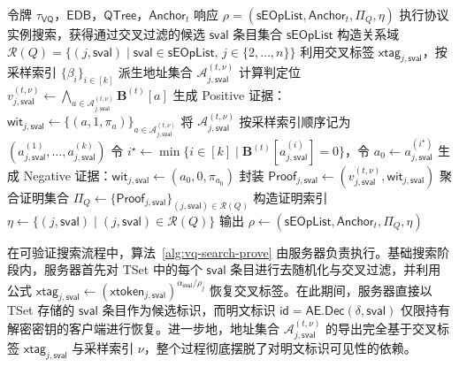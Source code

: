 \begin{algorithm}[!t]
\caption{可验证搜索算法 $\mathsf{Search\text{-}Prove}$}
\label{alg:vq-search-prove}
\begin{algorithmic}[1]
\REQUIRE 令牌 $\tau_{\mathsf{VQ}}$，$\mathsf{EDB}$，$\mathsf{QTree}$，$\mathsf{Anchor}_t$
\ENSURE 响应 $\rho=(\mathsf{sEOpList},\mathsf{Anchor}_t,\Pi_Q,\eta)$
\STATE 执行协议实例搜索，获得通过交叉过滤的候选 $\mathsf{sval}$ 条目集合 $\mathsf{sEOpList}$
\STATE 构造关系域 $\mathcal{R}(Q)=\{(j,\mathsf{sval})\mid \mathsf{sval}\in\mathsf{sEOpList},\,j\in\{2,\ldots,n\}\}$
  \STATE 利用交叉标签 $\mathsf{xtag}_{j,\mathsf{sval}}$，按采样索引 $\{\beta_i\}_{i\in[k]}$ 派生地址集合 $\mathcal{A}_{j,\mathsf{sval}}^{(t,\nu)}$
  \STATE 计算判定位 $v_{j,\mathsf{sval}}^{(t,\nu)}\leftarrow\bigwedge_{a\in\mathcal{A}_{j,\mathsf{sval}}^{(t,\nu)}}\mathbf{B}^{(t)}[a]$
    \STATE 生成 Positive 证据：$\mathsf{wit}_{j,\mathsf{sval}}\leftarrow\{(a,1,\pi_a)\}_{a\in\mathcal{A}_{j,\mathsf{sval}}^{(t,\nu)}}$
  \ELSE
    \STATE 将 $\mathcal{A}_{j,\mathsf{sval}}^{(t,\nu)}$ 按采样索引顺序记为 $(a_{j,\mathsf{sval}}^{(1)},\ldots,a_{j,\mathsf{sval}}^{(k)})$
    \STATE 令 $i^\star\leftarrow \min\{i\in[k]\mid \mathbf{B}^{(t)}[a_{j,\mathsf{sval}}^{(i)}]=0\}$，令 $a_0\leftarrow a_{j,\mathsf{sval}}^{(i^\star)}$
    \STATE 生成 Negative 证据：$\mathsf{wit}_{j,\mathsf{sval}}\leftarrow(a_0,0,\pi_{a_0})$
  \ENDIF
  \STATE 封装 $\mathsf{Proof}_{j,\mathsf{sval}}\leftarrow(v_{j,\mathsf{sval}}^{(t,\nu)},\mathsf{wit}_{j,\mathsf{sval}})$
\ENDFOR
\STATE 聚合证明集合 $\Pi_Q\leftarrow\{\mathsf{Proof}_{j,\mathsf{sval}}\}_{(j,\mathsf{sval})\in\mathcal{R}(Q)}$
\STATE 构造证明索引 $\eta\leftarrow\{(j,\mathsf{sval})\mid (j,\mathsf{sval})\in\mathcal{R}(Q)\}$
\STATE 输出 $\rho\leftarrow(\mathsf{sEOpList},\mathsf{Anchor}_t,\Pi_Q,\eta)$
\end{algorithmic}
\end{algorithm}

在可验证搜索流程中，算法~\ref{alg:vq-search-prove} 由服务器负责执行。基础搜索阶段内，服务器首先对 TSet 中的每个 $\mathsf{sval}$ 条目进行去随机化与交叉过滤，并利用公式 $\mathsf{xtag}_{j,\mathsf{sval}}\leftarrow(\mathsf{xtoken}_{j,\mathsf{sval}})^{\alpha_{\mathsf{sval}}/\rho_j}$ 恢复交叉标签。在此期间，服务器直接以 TSet 存储的 $\mathsf{sval}$ 条目作为候选标识，而明文标识 $\mathsf{id}=\mathsf{AE.Dec}(\delta,\mathsf{sval})$ 仅限持有解密密钥的客户端进行恢复。进一步地，地址集合 $\mathcal{A}_{j,\mathsf{sval}}^{(t,\nu)}$ 的导出完全基于交叉标签 $\mathsf{xtag}_{j,\mathsf{sval}}$ 与采样索引 $\nu$，整个过程彻底摆脱了对明文标识可见性的依赖。

